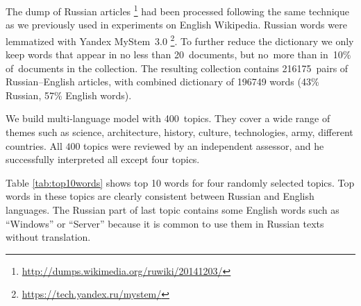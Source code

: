 \documentclass[russian]{llncs}
\begin{document}
The dump of Russian articles%
\footnote{\url{http://dumps.wikimedia.org/ruwiki/20141203/}}
had been processed following the same technique as we previously used in experiments on English Wikipedia.
Russian words were lemmatized with Yandex MyStem~3.0%
\footnote{\url{https://tech.yandex.ru/mystem/}}.
To further reduce the dictionary we only keep words
that appear in no less than 20~documents, but no~more than in~10\% of~documents in the collection.
The resulting collection contains 216175~pairs of Russian--English articles, with combined dictionary
of 196749 words (43\% Russian, 57\% English words).

We build multi-language model with 400~topics.
They cover a wide range of themes such as science, architecture, history, culture, technologies, army, different countries.
All $400$ topics were reviewed by an independent assessor,
and he successfully interpreted all except four topics.

Table \ref{tab:top10words} shows top 10 words for four randomly selected topics.
Top words in these topics are clearly consistent between Russian and English languages.
The Russian part of last topic contains some English words such as
``Windows'' or ``Server'' because it is common to use them in Russian texts without translation.
\end{document}

